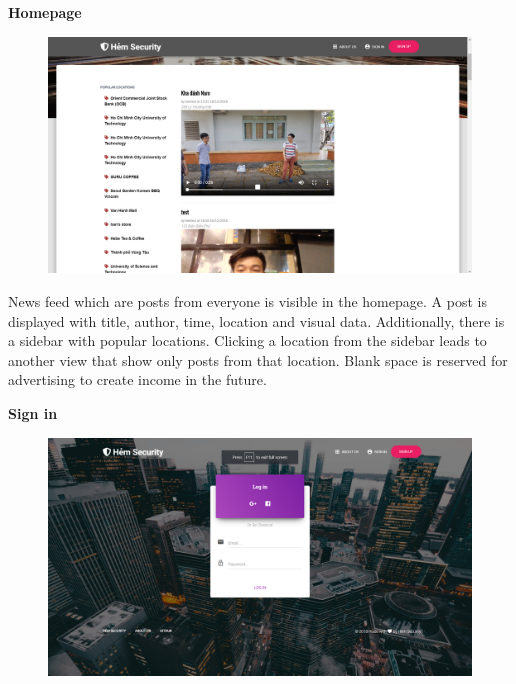\textbf{Homepage}
\begin{center}
    \begin{figure}[H]
    \centering
    \includegraphics[width=1\columnwidth]{images/chap4/homepage.png}
    \end{figure}
\end{center}

News feed which are posts from everyone is visible in the homepage. A post is displayed with title, author, time, location and visual data. Additionally, there is a sidebar with popular locations. Clicking a location from the sidebar leads to another view that show only posts from that location. Blank space is reserved for advertising to create income in the future.

\textbf{Sign in}
\begin{center}
    \begin{figure}[H]
    \centering
    \includegraphics[width=1\columnwidth]{images/chap4/login_form.png}
    \end{figure}
\end{center}

